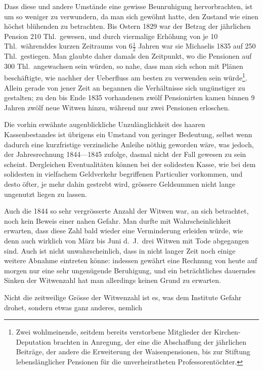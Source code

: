 \documentclass[12pt,a4paper]{article}
\begin{document}
Dass diese und andere Umst\"ande eine gewisse Beunruhigung hervorbrachten, ist um so weniger zu verwundern, da man sich gew\"ohnt hatte, den Zustand wie einen h\"ochst bl\"uhenden zu betrachten. Bis Ostern 1829 war der Betrag der j\"ahrlichen Pension 210 Thl.\ gewesen, und durch viermalige Erh\"ohung von je 10 Thl.\ w\"ahrenddes kurzen Zeitraums von $6\frac{1}{2}$ Jahren war sie Michaelis 1835 auf 250 Thl.\ gestiegen. Man glaubte daher damals den Zeitpunkt, wo die Pensionen auf 300 Thl.\ angewachsen sein w\"urden, so nahe, dass man sich schon mit Pl\"anen besch\"aftigte, wie nachher der Ueberfluss am besten zu verwenden sein w\"urde\footnote{Zwei wohlmeinende, seitdem bereits verstorbene Mitglieder der Kirchen-Deputation brachten in Anregung, der eine die Abschaffung der j\"ahrlichen Beitr\"age, der andere die Erweiterung der Waisenpensionen, bis zur Stiftung lebensl\"anglicher Pensionen f\"ur die unverheiratheten Professorent\"ochter.}. Allein gerade von jener Zeit an begannen die Verh\"altnisse sich ung\"unstiger zu gestalten; zu den bis Ende 1835 vorhandenen zw\"olf Pensionirten kamen binnen 9 Jahren zw\"olf neue Witwen hinzu, w\"ahrend nur zwei Pensionen erloschen.

Die vorhin erw\"ahnte augenblickliche Unzul\"anglichkeit des haaren Kassenbestandes ist \"ubrigens ein Umstand von geringer Bedeutung, selbst wenn dadurch eine kurzfristige verzinsliche Anleihe n\"othig geworden w\"are, was jedoch, der Jahresrechnung 1844---1845 zufolge, dasmal nicht der Fall gewesen zu sein scheint. Dergleichen Eventualit\"aten k\"onnen bei der solidesten Kasse, wie bei dem solidesten in vielfachem Geldverkehr begriffenen Particulier vorkommen, und desto \"ofter, je mehr dahin gestrebt wird, gr\"ossere Geldsummen nicht lange ungenutzt liegen zu lassen.

Auch die 1844 so sehr vergr\"osserte Anzahl der Witwen war, an sich betrachtet, noch kein Beweis einer nahen Gefahr. Man durfte mit Wahrscheinlichkeit erwarten, dass diese Zahl bald wieder eine Verminderung erleiden w\"urde, wie denn auch wirklich von M\"arz bis Juni d.\ J.\ drei Witwen mit Tode abgegangen sind. Auch ist nicht unwahrscheinlich, dass in nicht langer Zeit noch einige weitere Abnahme eintreten k\"onne: indessen gew\"ahrt eine Rechnung von heute auf morgen nur eine sehr ungen\"ugende Beruhigung, und ein betr\"achtliches dauerndes Sinken der Witwenzahl hat man allerdings keinen Grund zu erwarten.

Nicht die zeitweilige Gr\"osse der Witwenzahl ist es, was dem Institute Gefahr drohet, sondern etwas ganz anderes, nemlich
\end{document}
